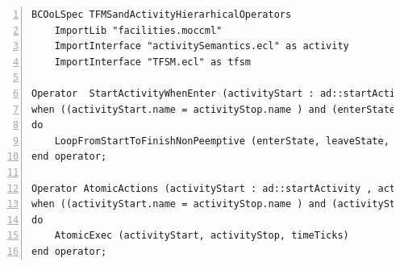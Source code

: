 \begin{lstlisting}[language=bcool,
caption={Timing and Hierarchical operator between TFSM and fUML languages},
label={lst:bcoolStartActivityWhenEnter}, 
basicstyle=\scriptsize\ttfamily, backgroundcolor=\color{LGrey}, numbers=left, xleftmargin=2pt]
BCOoLSpec TFMSandActivityHierarhicalOperators
	ImportLib "facilities.moccml"
	ImportInterface "activitySemantics.ecl" as activity
	ImportInterface "TFSM.ecl" as tfsm

Operator  StartActivityWhenEnter (activityStart : ad::startActivity , activityStop : ad::finishActivity, enterState : tfsm::entering, leaveState : tfsm::leaving)
when ((activityStart.name = activityStop.name ) and (enterState.name = leaveState.name) and (activityStart.name = enterState.onEnterAction.name));
do 
	LoopFromStartToFinishNonPeemptive (enterState, leaveState, activityStart, activityStop)
end operator;

Operator AtomicActions (activityStart : ad::startActivity , activityStop : ad::finishActivity, enterState : tfsm::entering, leaveState : tfsm::leaving, timeTicks : tfsm::ticks)
when ((activityStart.name = activityStop.name ) and (activityStart.name=enterState.OnEnterAction.name ) and (enterState.owningFSM.localClock = timeTicks));
do 
	AtomicExec (activityStart, activityStop, timeTicks)
end operator;
\end{lstlisting}



